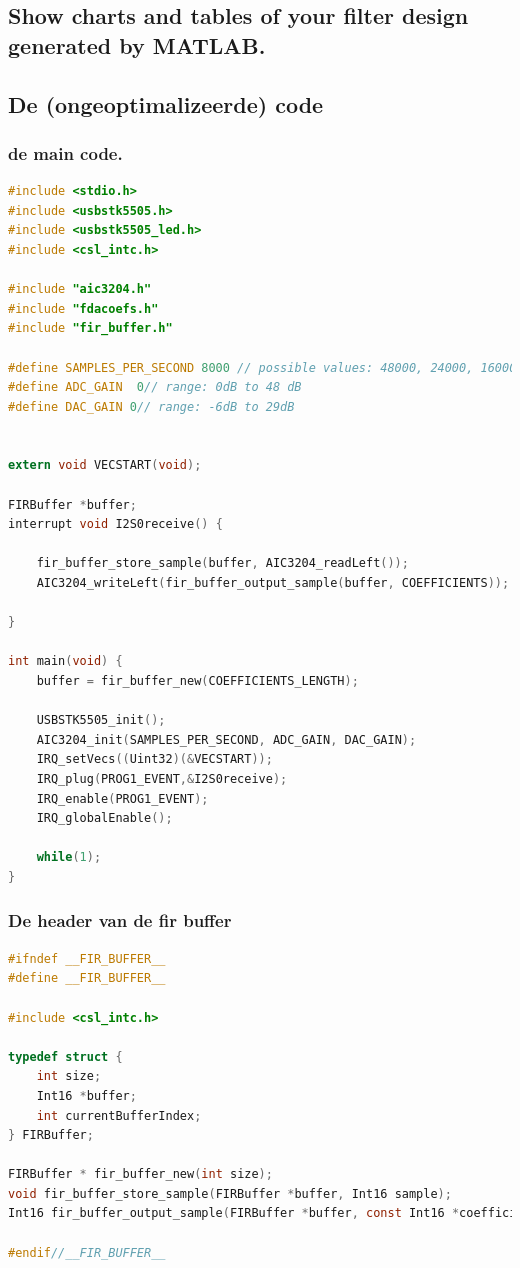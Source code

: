 \documentclass[11pt,a4paper]{article}
\begin{document}
	\subsection{Show charts and tables of your filter design generated by MATLAB.}
	\clearpage
	
	\subsection{De (ongeoptimalizeerde) code}
	\subsubsection{de main code.}

	\begin{lstlisting}[language=c]
#include <stdio.h>
#include <usbstk5505.h>
#include <usbstk5505_led.h>
#include <csl_intc.h>

#include "aic3204.h"
#include "fdacoefs.h"
#include "fir_buffer.h"

#define SAMPLES_PER_SECOND 8000 // possible values: 48000, 24000, 16000, 12000, 9600, and 8000
#define ADC_GAIN  0// range: 0dB to 48 dB
#define DAC_GAIN 0// range: -6dB to 29dB


extern void VECSTART(void);

FIRBuffer *buffer;
interrupt void I2S0receive() {

    fir_buffer_store_sample(buffer, AIC3204_readLeft());
    AIC3204_writeLeft(fir_buffer_output_sample(buffer, COEFFICIENTS));

}

int main(void) {
    buffer = fir_buffer_new(COEFFICIENTS_LENGTH);

    USBSTK5505_init();
    AIC3204_init(SAMPLES_PER_SECOND, ADC_GAIN, DAC_GAIN);
    IRQ_setVecs((Uint32)(&VECSTART));
    IRQ_plug(PROG1_EVENT,&I2S0receive);
    IRQ_enable(PROG1_EVENT);
    IRQ_globalEnable();

    while(1);
}
	\end{lstlisting}
	\clearpage	

	\subsubsection{De header van de fir buffer}
	\begin{lstlisting}[language=c]
#ifndef __FIR_BUFFER__
#define __FIR_BUFFER__

#include <csl_intc.h>

typedef struct {
    int size;
    Int16 *buffer;
    int currentBufferIndex;
} FIRBuffer;

FIRBuffer * fir_buffer_new(int size);
void fir_buffer_store_sample(FIRBuffer *buffer, Int16 sample);
Int16 fir_buffer_output_sample(FIRBuffer *buffer, const Int16 *coefficients);

#endif//__FIR_BUFFER__

	\end{lstlisting}
	\clearpage
\end{document}
